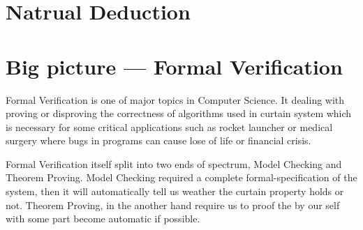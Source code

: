 


\section{Natrual Deduction}

\section{Big picture --- Formal Verification}
Formal Verification is one of major topics in Computer Science. It dealing with proving or disproving the correctness of algorithms used in curtain system\supercite{formal-verification-wiki}  which is necessary for some critical applications such as rocket launcher or medical surgery where bugs in programs can cause lose of life or financial crisis.

Formal Verification itself split into two ends of spectrum, Model Checking and Theorem Proving. Model Checking required a complete formal-specification of the system, then it will automatically tell us weather the curtain property holds or not. Theorem Proving, in the another hand require us to proof the by our self with some part become automatic if possible.

